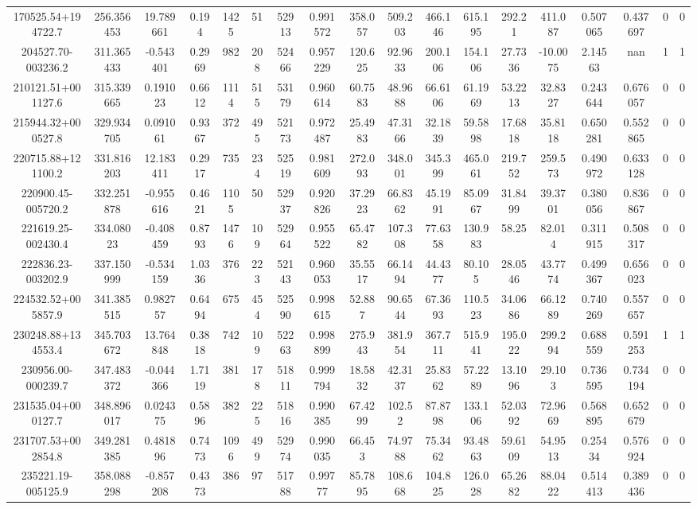 \begin{table}
\begin{tabular}{cccccccccccccccccc}
170525.54+194722.7 & 256.356453 & 19.789661 & 0.194 & 1425 & 51 & 52913 & 0.991572 & 358.057 & 509.203 & 466.146 & 615.195 & 292.21 & 411.087 & 0.507065 & 0.437697 & 0 & 0 \\
204527.70-003236.2 & 311.365433 & -0.543401 & 0.2969 & 982 & 208 & 52466 & 0.957229 & 120.625 & 92.9633 & 200.106 & 154.106 & 27.7336 & -10.0075 & 2.14563 & nan & 1 & 1 \\
210121.51+001127.6 & 315.339665 & 0.191023 & 0.6612 & 1114 & 515 & 53179 & 0.960614 & 60.7583 & 48.9688 & 66.6106 & 61.1969 & 53.2213 & 32.8327 & 0.243644 & 0.676057 & 0 & 0 \\
215944.32+000527.8 & 329.934705 & 0.091061 & 0.9367 & 372 & 495 & 52173 & 0.972487 & 25.4983 & 47.3166 & 32.1839 & 59.5898 & 17.6818 & 35.8118 & 0.650281 & 0.552865 & 0 & 0 \\
220715.88+121100.2 & 331.816203 & 12.183411 & 0.2917 & 735 & 234 & 52519 & 0.981609 & 272.093 & 348.001 & 345.399 & 465.061 & 219.752 & 259.573 & 0.490972 & 0.633128 & 0 & 0 \\
220900.45-005720.2 & 332.251878 & -0.955616 & 0.4621 & 1105 & 50 & 52937 & 0.920826 & 37.2923 & 66.8362 & 45.1991 & 85.0967 & 31.8499 & 39.3701 & 0.380056 & 0.836867 & 0 & 0 \\
221619.25-002430.4 & 334.08023 & -0.408459 & 0.8793 & 1476 & 109 & 52964 & 0.955522 & 65.4782 & 107.308 & 77.6358 & 130.983 & 58.25 & 82.014 & 0.311915 & 0.508317 & 0 & 0 \\
222836.23-003202.9 & 337.150999 & -0.534159 & 1.0336 & 376 & 223 & 52143 & 0.960053 & 35.5517 & 66.1494 & 44.4377 & 80.105 & 28.0546 & 43.7774 & 0.499367 & 0.656023 & 0 & 0 \\
224532.52+005857.9 & 341.385515 & 0.982757 & 0.6494 & 675 & 454 & 52590 & 0.998615 & 52.887 & 90.6544 & 67.3693 & 110.523 & 34.0686 & 66.1289 & 0.740269 & 0.557657 & 0 & 0 \\
230248.88+134553.4 & 345.703672 & 13.764848 & 0.3818 & 742 & 109 & 52263 & 0.998899 & 275.943 & 381.954 & 367.711 & 515.941 & 195.022 & 299.294 & 0.688559 & 0.591253 & 1 & 1 \\
230956.00-000239.7 & 347.483372 & -0.044366 & 1.7119 & 381 & 178 & 51811 & 0.999794 & 18.5832 & 42.3137 & 25.8362 & 57.2289 & 13.1096 & 29.103 & 0.736595 & 0.734194 & 0 & 0 \\
231535.04+000127.7 & 348.896017 & 0.024375 & 0.5896 & 382 & 225 & 51816 & 0.990385 & 67.4299 & 102.52 & 87.8798 & 133.106 & 52.0392 & 72.9669 & 0.568895 & 0.652679 & 0 & 0 \\
231707.53+002854.8 & 349.281385 & 0.481896 & 0.7473 & 1096 & 499 & 52974 & 0.990035 & 66.453 & 74.9788 & 75.3462 & 93.4863 & 59.6109 & 54.9513 & 0.25434 & 0.576924 & 0 & 0 \\
235221.19-005125.9 & 358.088298 & -0.857208 & 0.4373 & 386 & 97 & 51788 & 0.99777 & 85.7895 & 108.668 & 104.825 & 126.028 & 65.2682 & 88.0422 & 0.514413 & 0.389436 & 0 & 0 \\
\end{tabular}
\end{table}
